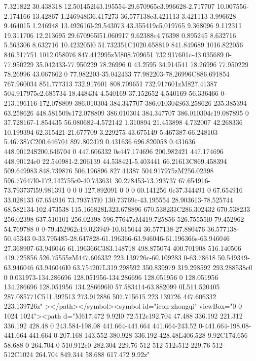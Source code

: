 {7.321822 30.438318 12.501452l43.195554-29.670965c3.996628-2.717707 10.007556-2.174166 13.42867 1.246948l36.417273
36.577138c3.421113 3.421113 3.996628 9.464015 1.246948 13.492616l-29.543073 43.355419c5.019765 9.368096 9.112311 19.311706
12.213695 29.670965l51.060917 9.62388c4.76398 0.895245 8.632716 5.563306 8.632716 10.423205l0 51.732351C1020.658819 841.849689
1016.822056 846.517751 1012.058076 847.412995zM808.709651 732.917601c-43.035689 0-77.950229 35.042433-77.950229 78.26996 0
43.2595 34.914541 78.26996 77.950229 78.26996 43.067662 0 77.982203-35.042433 77.982203-78.26996C886.691854 767.960034 851.777313
732.917601 808.709651 732.917601zM827.41387 504.917975c2.685734-18.448434 4.540169-37.152652 4.540169-56.336466
0-213.196116-172.078809-386.010304-384.347707-386.010304S63.258626 235.385394 63.258626 448.581509s172.078809 386.010304
384.347707 386.010304c19.087895 0 37.728167-1.854435 56.080682-4.572142 1.310894 21.453898 4.732007 42.268336 10.199394
62.315421-21.677709 3.229275-43.675149 5.467387-66.248103 5.467387C200.646704 897.802479 0.431636 696.820058 0.431636
448.90124S200.646704 0 447.606332 0s447.174696 200.982421 447.174696 448.90124c0 22.540981-2.206139 44.538421-5.403441
66.21613C869.458394 509.649983 848.739876 506.196896 827.41387 504.917975zM256.02398 596.77647l0-172.142755c0-40.733631
30.278453-73.793737 67.654916-73.793737l59.981391 0 0 0 127.892091 0 0 0 60.141256 0c37.344491 0 67.654916 33.028133 67.654916
73.793737l0 130.73769c-43.195554 28.903613-78.525744 68.582134-102.473538 115.166828L323.678896 670.538233C286.302432 670.538233
256.02398 637.510101 256.02398 596.77647zM419.725856 526.75555l0 79.452962 54.769788 0 0-79.452962c19.023949-10.615044
36.577138-27.880476 36.577138-50.45343 0-33.795485-28.647828-61.196366-63.946046-61.196366s-63.946046 27.368907-63.946046
61.196366C383.148718 498.875074 400.701908 516.140506 419.725856 526.75555zM447.606332 223.139726c-60.109283 0-63.78618
50.549349-63.946046 63.946046l0 63.754207L319.298592 350.839979 319.298592 293.288538c0 0 0.031973-134.286696
128.051956-134.286696 128.051956 0 128.051956 134.286696 128.051956 134.286696l0 57.583414-63.882099 0L511.520405
287.085771C511.392513 273.912886 507.715615 223.139726 447.606332 223.139726z"  ></path></symbol><symbol id="icon-zhongqi"
viewBox="0 0 1024 1024"><path d="M617.472 9.92l0 72.512c192.704 47.488 336.192 221.312 336.192 428.48 0 243.584-198.08
441.664-441.664 441.664-243.52 0-441.664-198.08-441.664-441.664 0-207.168 143.552-380.928 336.192-428.48L406.528 9.92C174.656
58.688 0 264.704 0 510.912c0 282.304 229.76 512 512 512s512-229.76 512-512C1024 264.704 849.344 58.688 617.472 9.92z"
}
